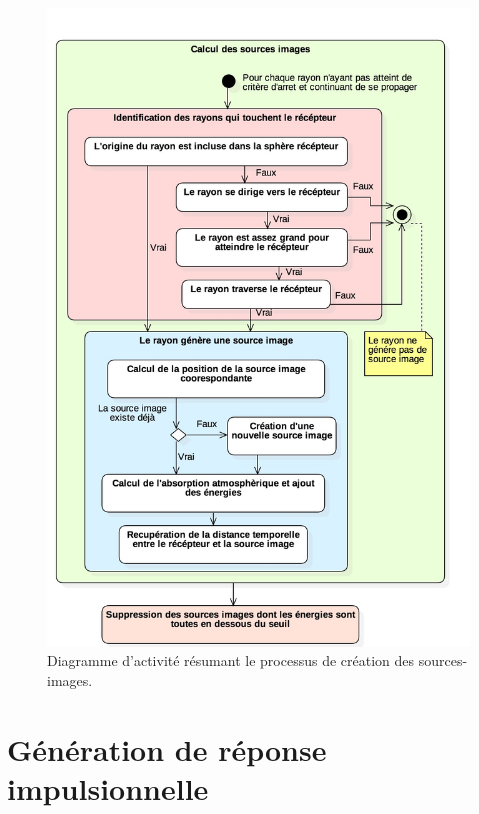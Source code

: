 %
\begin{figure}[h]
\centering
	\includegraphics[width=0.8\linewidth]{images/DiagSi}
	\caption{Diagramme d'activité résumant le processus de création des sources-images.}
	\label{DiagSi}
\end{figure}
%

\section{Génération de réponse impulsionnelle} \label{sect_rir}

